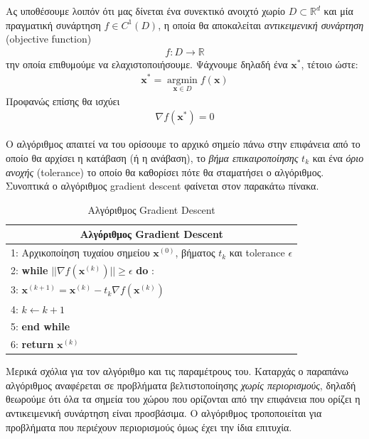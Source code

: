 \documentclass[11pt]{article} %
\numberwithin{equation}{subsection}
\begin{document}
Ας υποθέσουμε λοιπόν ότι μας δίνεται ένα συνεκτικό ανοιχτό χωρίο $D \subset \mathbb{R}^d$ και μία πραγματική συνάρτηση $f \in C^1 (D)$, η οποία θα αποκαλείται \textit{αντικειμενική συνάρτηση} (objective function)
\begin{align*}
f : D \rightarrow \mathbb{R}
\end{align*}
την οποία επιθυμούμε να ελαχιστοποιήσουμε. Ψάχνουμε δηλαδή ένα $\textbf{x}^*$, τέτοιο ώστε:
\begin{align*}
\textbf{x}^* =  \operatorname*{argmin}_{\textbf{x} \in D} f(\textbf{x})
\end{align*}
Προφανώς επίσης θα ισχύει
\begin{align*}
\nabla f(\textbf{x}^*) = 0
\end{align*}

Ο αλγόριθμος απαιτεί να του ορίσουμε το αρχικό σημείο πάνω στην επιφάνεια από το οποίο θα αρχίσει η κατάβαση (ή η ανάβαση), το \textit{βήμα επικαιροποίησης} $t_k$ και ένα \textit{όριο ανοχής} (tolerance) το οποίο θα καθορίσει πότε θα σταματήσει ο αλγόριθμος. Συνοπτικά ο αλγόριθμος gradient descent φαίνεται στον παρακάτω πίνακα. \\

\begin{table}[H]
\begin{tabular}{ |p{13cm}}
 \hline
 \multicolumn{1}{|c|}{\textbf{Αλγόριθμος Gradient Descent}} \\
 \hline
1: Αρχικοποίηση τυχαίου σημείου $\textbf{x}^{(0)}$, βήματος $t_k$ και tolerance $\epsilon$ \\
2: \textbf{while} $||\nabla f(\textbf{x}^{(k)})|| \geq \epsilon$ \textbf{do} :  \\
3: $\textbf{x}^{(k+1)} = \textbf{x}^{(k)} - t_{k} \nabla f(\textbf{x}^{(k)})$\\
4: $k \leftarrow k + 1$ \\
5: \textbf{end while}  \\
6: \textbf{return} $\textbf{x}^{(k)}$\\
\hline
\end{tabular}
\caption{Αλγόριθμος Gradient Descent}
\end{table} 

Μερικά σχόλια για τον αλγόριθμο και τις παραμέτρους του. Καταρχάς ο παραπάνω αλγόριθμος αναφέρεται σε προβλήματα βελτιστοποίησης \textit{χωρίς περιορισμούς}, δηλαδή θεωρούμε ότι όλα τα σημεία του χώρου που ορίζονται από την επιφάνεια που ορίζει η αντικειμενική συνάρτηση είναι προσβάσιμα. Ο αλγόριθμος τροποποιείται για προβλήματα που περιέχουν περιορισμούς όμως έχει την ίδια επιτυχία.\\
\end{document}

